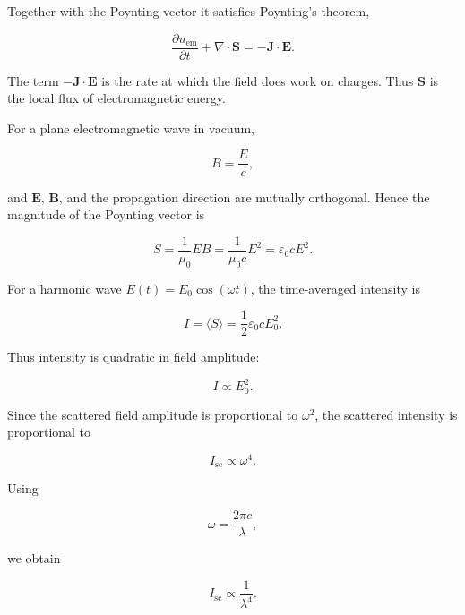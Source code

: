\documentclass[11pt,a4paper]{article}
\begin{document}
Together with the Poynting vector it satisfies Poynting's theorem,

\begin{equation}
\frac{\partial u_{\mathrm{em}}}{\partial t}
+
\nabla\cdot\mathbf{S}
=
-\mathbf{J}\cdot\mathbf{E}.
\end{equation}

The term \(-\mathbf{J}\cdot\mathbf{E}\) is the rate at which the field does
work on charges. Thus \(\mathbf{S}\) is the local flux of electromagnetic
energy.

For a plane electromagnetic wave in vacuum,

\begin{equation}
B = \frac{E}{c},
\end{equation}

and \(\mathbf{E}\), \(\mathbf{B}\), and the propagation direction are mutually
orthogonal. Hence the magnitude of the Poynting vector is

\begin{equation}
S
=
\frac{1}{\mu_0}EB
=
\frac{1}{\mu_0 c}E^2
=
\varepsilon_0 c E^2.
\end{equation}

For a harmonic wave \(E(t)=E_0\cos(\omega t)\), the time-averaged intensity is

\begin{equation}
I = \langle S\rangle
=
\frac{1}{2}\varepsilon_0 c E_0^2.
\end{equation}

Thus intensity is quadratic in field amplitude:

\begin{equation}
I \propto E_0^2.
\end{equation}

Since the scattered field amplitude is proportional to \(\omega^2\), the
scattered intensity is proportional to

\begin{equation}
I_{\mathrm{sc}} \propto \omega^4.
\end{equation}

Using

\begin{equation}
\omega = \frac{2\pi c}{\lambda},
\end{equation}

we obtain

\begin{equation}
I_{\mathrm{sc}} \propto \frac{1}{\lambda^4}.
\end{equation}
\end{document}
